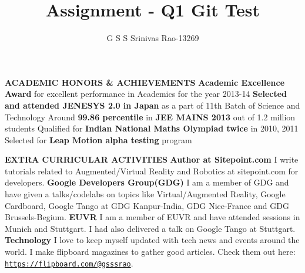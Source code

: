 \documentclass[9pt]{article}
\title{Assignment - Q1 Git\cite{Github} Test}
\author{G S S Srinivas Rao-13269}
\date{}
\begin{document}
\maketitle

\vspace{0.5cm}
\raggedright
\textbf{\large{ACADEMIC HONORS \& ACHIEVEMENTS}}\vspace{0.1cm}
\newline
\textbf{Academic Excellence Award} for excellent performance in Academics for the year 2013-14
\newline
\textbf{Selected and attended JENESYS 2.0 in Japan} as a part of 11th Batch of Science and Technology
\newline
Around \textbf{99.86 percentile} in \textbf{JEE MAINS 2013} out of 1.2 million students
\newline
Qualified for \textbf{Indian National Maths Olympiad twice} in 2010, 2011
\newline
Selected for \textbf{Leap Motion alpha testing} program

\vspace{0.5cm}
\raggedright
\textbf{\large{EXTRA CURRICULAR ACTIVITIES}}\vspace{0.1cm}
\newline
\textbf{Author at Sitepoint.com} I write tutorials related to Augmented/Virtual Reality and Robotics at sitepoint.com for developers.
\newline
\textbf{Google Developers Group(GDG) }{I am a member of GDG and have given a talks/codelabs on topics like Virtual/Augmented Reality, Google Cardboard, Google Tango at GDG Kanpur-India, GDG Nice-France and GDG Brussels-Begium.}
\newline
\textbf{EUVR }{I am a member of EUVR and have attended sessions in Munich and Stuttgart. I had also delivered a talk on Google Tango at Stuttgart.}
\newline
\textbf{Technology }{{I love to keep myself updated with tech news and events around the world. I make flipboard magazines to gather good articles. Check them out here: \underline{\texttt{https://flipboard.com/@gsssrao}}}}.



\end{document}
